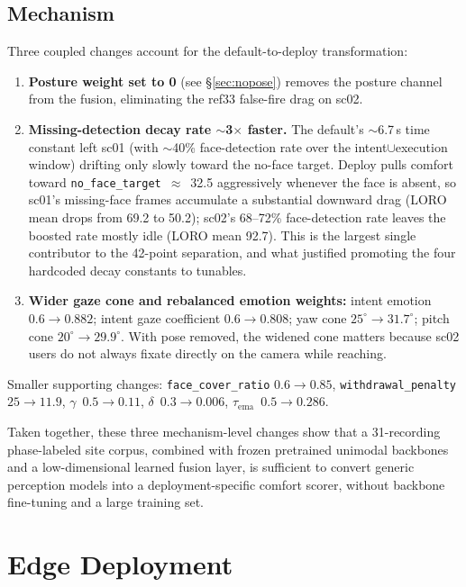 \documentclass{article}
\newcommand{\code}[1]{\texttt{\small #1}}
\begin{document}
\subsection{Mechanism}\label{sec:mechanism}

Three coupled changes account for the default-to-deploy transformation:
\begin{enumerate}
  \item \textbf{Posture weight set to 0} (see \S\ref{sec:nopose}) removes the posture channel from the fusion, eliminating the ref33 false-fire drag on sc02.
  \item \textbf{Missing-detection decay rate $\sim$3$\times$ faster.} The default's $\sim$6.7\,s time constant left sc01 (with $\sim$40\% face-detection rate over the intent$\cup$execution window) drifting only slowly toward the no-face target. Deploy pulls comfort toward \code{no\_face\_target}~$\approx$~32.5 aggressively whenever the face is absent, so sc01's missing-face frames accumulate a substantial downward drag (LORO mean drops from 69.2 to 50.2); sc02's 68--72\% face-detection rate leaves the boosted rate mostly idle (LORO mean 92.7). This is the largest single contributor to the 42-point separation, and what justified promoting the four hardcoded decay constants to tunables.
  \item \textbf{Wider gaze cone and rebalanced emotion weights:} intent emotion $0.6 \to 0.882$; intent gaze coefficient $0.6 \to 0.808$; yaw cone $25^\circ \to 31.7^\circ$; pitch cone $20^\circ \to 29.9^\circ$. With pose removed, the widened cone matters because sc02 users do not always fixate directly on the camera while reaching.
\end{enumerate}

Smaller supporting changes: \code{face\_cover\_ratio} $0.6 \to 0.85$, \code{withdrawal\_penalty} $25 \to 11.9$, $\gamma$~$0.5 \to 0.11$, $\delta$~$0.3 \to 0.006$, $\tau_\text{ema}$~$0.5 \to 0.286$.

Taken together, these three mechanism-level changes show that a 31-recording phase-labeled site corpus, combined with frozen pretrained unimodal backbones and a low-dimensional learned fusion layer, is sufficient to convert generic perception models into a deployment-specific comfort scorer, without backbone fine-tuning and a large training set.

\section{Edge Deployment}\label{sec:distill}
\end{document}
